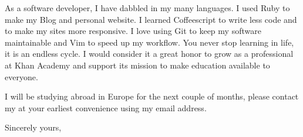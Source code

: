 \documentclass{letter} %
\begin{document}
\begin{letter}{}
\noindent As a software developer, I have dabbled in my many languages.  I used Ruby to make my Blog and personal website.  I learned Coffeescript to write less code and to make my sites more responsive.  I love using Git to keep my software maintainable and Vim to speed up my workflow.  You never stop learning in life, it is an endless cycle.  I would consider it a great honor to grow as a professional at Khan Academy and support its mission to make education available to everyone.

\noindent I will be studying abroad in Europe for the next couple of months, please contact my at your earliest convenience using my email address.

\closing{Sincerely yours,} 
 

 


\end{letter}
 
\end{document}
